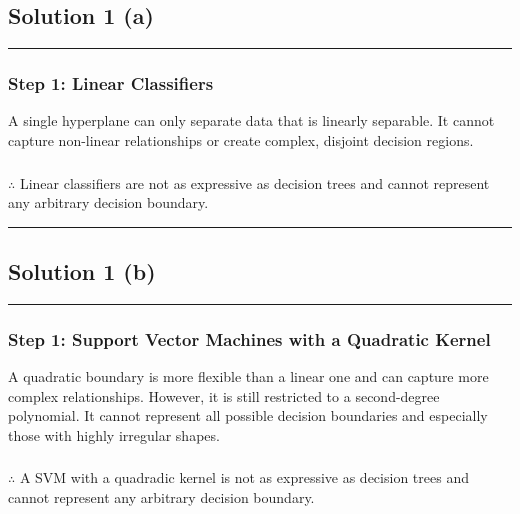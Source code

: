 \documentclass{article}
\begin{document}
\pagestyle{fancy}

\subsection*{Solution 1 (a)}
\noindent\rule{\textwidth}{0.4pt}

\subsubsection*{Step 1: Linear Classifiers}
\parbox{\textwidth}{
A single hyperplane can only separate data that is linearly separable. It cannot capture non-linear relationships or create complex, disjoint decision regions.
}

\subsubsection*{\normalfont}{$\therefore$ Linear classifiers are not as expressive as decision trees and cannot represent any arbitrary decision boundary.}

\noindent\rule{\textwidth}{0.4pt}

\newpage

\subsection*{Solution 1 (b)}
\noindent\rule{\textwidth}{0.4pt}

\subsubsection*{Step 1: Support Vector Machines with a Quadratic Kernel}
\parbox{\textwidth}{
A quadratic boundary is more flexible than a linear one and can capture more complex relationships. However, it is still restricted to a second-degree polynomial. It cannot represent all possible decision boundaries and especially those with highly irregular shapes.
}

\subsubsection*{\normalfont}{$\therefore$ A SVM with a quadradic kernel is not as expressive as decision trees and cannot represent any arbitrary decision boundary.}
\end{document}
